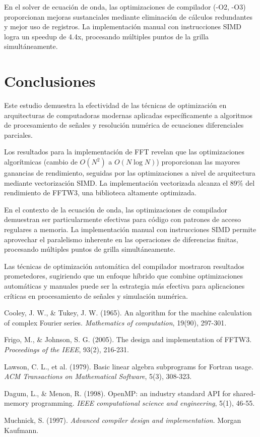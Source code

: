 \documentclass[a4paper]{article}
\begin{document}
En el solver de ecuación de onda, las optimizaciones de compilador (-O2, -O3) proporcionan mejoras sustanciales mediante eliminación de cálculos redundantes y mejor uso de registros. La implementación manual con instrucciones SIMD logra un speedup de 4.4x, procesando múltiples puntos de la grilla simultáneamente.

\section{Conclusiones}

Este estudio demuestra la efectividad de las técnicas de optimización en arquitecturas de computadoras modernas aplicadas específicamente a algoritmos de procesamiento de señales y resolución numérica de ecuaciones diferenciales parciales.

Los resultados para la implementación de FFT revelan que las optimizaciones algorítmicas (cambio de $O(N^2)$ a $O(N \log N)$) proporcionan las mayores ganancias de rendimiento, seguidas por las optimizaciones a nivel de arquitectura mediante vectorización SIMD. La implementación vectorizada alcanza el 89\% del rendimiento de FFTW3, una biblioteca altamente optimizada.

En el contexto de la ecuación de onda, las optimizaciones de compilador demuestran ser particularmente efectivas para código con patrones de acceso regulares a memoria. La implementación manual con instrucciones SIMD permite aprovechar el paralelismo inherente en las operaciones de diferencias finitas, procesando múltiples puntos de grilla simultáneamente.

Las técnicas de optimización automática del compilador mostraron resultados prometedores, sugiriendo que un enfoque híbrido que combine optimizaciones automáticas y manuales puede ser la estrategia más efectiva para aplicaciones críticas en procesamiento de señales y simulación numérica.

\begin{thebibliography}{9}
Cooley, J. W., \& Tukey, J. W. (1965). An algorithm for the machine calculation of complex Fourier series. \textit{Mathematics of computation}, 19(90), 297-301.

Frigo, M., \& Johnson, S. G. (2005). The design and implementation of FFTW3. \textit{Proceedings of the IEEE}, 93(2), 216-231.

Lawson, C. L., et al. (1979). Basic linear algebra subprograms for Fortran usage. \textit{ACM Transactions on Mathematical Software}, 5(3), 308-323.

Dagum, L., \& Menon, R. (1998). OpenMP: an industry standard API for shared-memory programming. \textit{IEEE computational science and engineering}, 5(1), 46-55.

Muchnick, S. (1997). \textit{Advanced compiler design and implementation}. Morgan Kaufmann.
\end{thebibliography}
\end{document}
